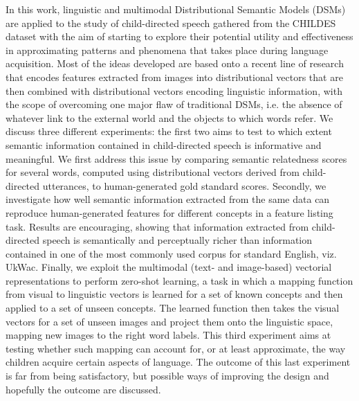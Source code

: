 \documentclass[10pt, a4paper, twopage, headinclude, footinclude, BCOR5mm]{book}
\begin{document}
\begin{table}[t!]
\end{table} 
\noindent
  In this work, linguistic and multimodal Distributional Semantic Models (DSMs) are applied to the study of child-directed speech gathered from the CHILDES dataset with the aim of starting to explore their potential utility and effectiveness in approximating patterns and phenomena that takes place during language acquisition. Most of the ideas developed are based onto a recent line of research that encodes features extracted from images into distributional vectors that are then combined with distributional vectors encoding linguistic information, with the scope of overcoming one major flaw of traditional DSMs, i.e. the absence of whatever link to the external world and the objects to which words refer.   We discuss three different experiments: the first two aims to test to which extent semantic information contained in child-directed speech is informative and meaningful. We first address this issue by comparing semantic relatedness scores for several words, computed using distributional vectors derived from child-directed utterances, to human-generated gold standard scores. Secondly, we investigate how well semantic information extracted from the same data can reproduce human-generated features for different concepts in a feature listing task. Results are encouraging, showing that information extracted from child-directed speech is semantically and perceptually richer than information contained in one of the most commonly used corpus for standard English, viz. UkWac.   Finally, we exploit the multimodal (text- and image-based) vectorial representations to perform zero-shot learning, a task in which a mapping function from visual to linguistic vectors is learned for a set of known concepts and then applied to a set of unseen concepts. The learned function then takes the visual vectors for a set of unseen images and project them onto the linguistic space, mapping new images to the right word labels. This third experiment aims at testing whether such mapping can account for, or at least approximate, the way children acquire certain aspects of language. The outcome of this last experiment is far from being satisfactory, but possible ways of improving the design and hopefully the outcome are discussed.  
\end{document}
